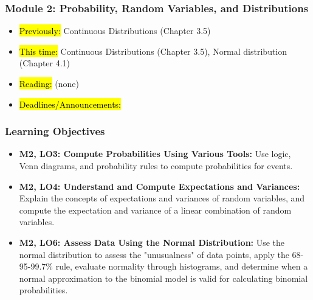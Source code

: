 
\begin{frame}
    \frametitle{Module 2: Probability, Random Variables, and Distributions}
    \begin{itemize}
        \item \hl{Previously: }Continuous Distributions (Chapter 3.5)
        \item \hl{This time: }Continuous Distributions (Chapter 3.5), Normal distribution (Chapter 4.1)
        \item \hl{Reading: }(none)
        \item \hl{Deadlines/Announcements: }
    \end{itemize}

\end{frame}

\begin{frame}
    \frametitle{Learning Objectives}
    \begin{itemize}
        \item \textbf{M2, LO3: Compute Probabilities Using Various Tools:} Use logic, Venn diagrams, and probability rules to compute probabilities for events.
        \item \textbf{M2, LO4: Understand and Compute Expectations and Variances:} Explain the concepts of expectations and variances of random variables, and compute the expectation and variance of a linear combination of random variables.
        \item \textbf{M2, LO6: Assess Data Using the Normal Distribution:} Use the normal distribution to assess the "unusualness" of data points, apply the 68-95-99.7\% rule, evaluate normality through histograms, and determine when a normal approximation to the binomial model is valid for calculating binomial probabilities.
    \end{itemize}
\end{frame}
